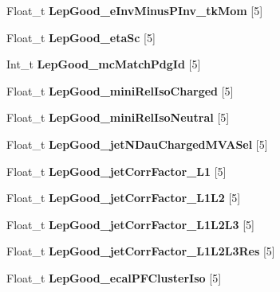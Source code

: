 \begin{DoxyCompactItemize}
Float\+\_\+t {\bfseries Lep\+Good\+\_\+e\+Inv\+Minus\+P\+Inv\+\_\+tk\+Mom} \mbox{[}5\mbox{]}
\item 
\hypertarget{classMiniTree_a15291fb0482a609a77255d1c95ba499f}{}\label{classMiniTree_a15291fb0482a609a77255d1c95ba499f} 
Float\+\_\+t {\bfseries Lep\+Good\+\_\+eta\+Sc} \mbox{[}5\mbox{]}
\item 
\hypertarget{classMiniTree_af4ae3af3bad9c627ac822fa69f589cf9}{}\label{classMiniTree_af4ae3af3bad9c627ac822fa69f589cf9} 
Int\+\_\+t {\bfseries Lep\+Good\+\_\+mc\+Match\+Pdg\+Id} \mbox{[}5\mbox{]}
\item 
\hypertarget{classMiniTree_acc9141879db84c4c6ea180a482a0ff92}{}\label{classMiniTree_acc9141879db84c4c6ea180a482a0ff92} 
Float\+\_\+t {\bfseries Lep\+Good\+\_\+mini\+Rel\+Iso\+Charged} \mbox{[}5\mbox{]}
\item 
\hypertarget{classMiniTree_ac950d0659ffbb7f82b4b8f75e721cf73}{}\label{classMiniTree_ac950d0659ffbb7f82b4b8f75e721cf73} 
Float\+\_\+t {\bfseries Lep\+Good\+\_\+mini\+Rel\+Iso\+Neutral} \mbox{[}5\mbox{]}
\item 
\hypertarget{classMiniTree_ad79e121c72dc4e5e00988b9ef45c5203}{}\label{classMiniTree_ad79e121c72dc4e5e00988b9ef45c5203} 
Float\+\_\+t {\bfseries Lep\+Good\+\_\+jet\+N\+Dau\+Charged\+M\+V\+A\+Sel} \mbox{[}5\mbox{]}
\item 
\hypertarget{classMiniTree_a291b655d81480ed814743039544597d1}{}\label{classMiniTree_a291b655d81480ed814743039544597d1} 
Float\+\_\+t {\bfseries Lep\+Good\+\_\+jet\+Corr\+Factor\+\_\+\+L1} \mbox{[}5\mbox{]}
\item 
\hypertarget{classMiniTree_afc0e5c24fd99b5db5fb11a34dc5d21d4}{}\label{classMiniTree_afc0e5c24fd99b5db5fb11a34dc5d21d4} 
Float\+\_\+t {\bfseries Lep\+Good\+\_\+jet\+Corr\+Factor\+\_\+\+L1\+L2} \mbox{[}5\mbox{]}
\item 
\hypertarget{classMiniTree_a65a3b3e59f3ad8ee076b2c98862a4006}{}\label{classMiniTree_a65a3b3e59f3ad8ee076b2c98862a4006} 
Float\+\_\+t {\bfseries Lep\+Good\+\_\+jet\+Corr\+Factor\+\_\+\+L1\+L2\+L3} \mbox{[}5\mbox{]}
\item 
\hypertarget{classMiniTree_ab9356739afc8a2539cc0e65d99556f6e}{}\label{classMiniTree_ab9356739afc8a2539cc0e65d99556f6e} 
Float\+\_\+t {\bfseries Lep\+Good\+\_\+jet\+Corr\+Factor\+\_\+\+L1\+L2\+L3\+Res} \mbox{[}5\mbox{]}
\item 
\hypertarget{classMiniTree_a14c0e76441526236d1874719e7889758}{}\label{classMiniTree_a14c0e76441526236d1874719e7889758} 
Float\+\_\+t {\bfseries Lep\+Good\+\_\+ecal\+P\+F\+Cluster\+Iso} \mbox{[}5\mbox{]}

\end{DoxyCompactItemize}
